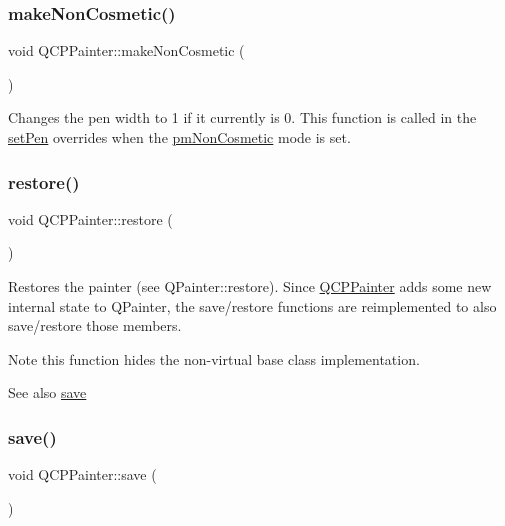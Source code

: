 \subsubsection{\texorpdfstring{make\+Non\+Cosmetic()}{makeNonCosmetic()}}
{\footnotesize\ttfamily void Q\+C\+P\+Painter\+::make\+Non\+Cosmetic (\begin{DoxyParamCaption}{ }\end{DoxyParamCaption})}

Changes the pen width to 1 if it currently is 0. This function is called in the \mbox{\hyperlink{class_q_c_p_painter_af9c7a4cd1791403901f8c5b82a150195}{set\+Pen}} overrides when the \mbox{\hyperlink{class_q_c_p_painter_a156cf16444ff5e0d81a73c615fdb156dac1e481bfaf408f2bd2eaad3ec341f36b}{pm\+Non\+Cosmetic}} mode is set. \mbox{\label{class_q_c_p_painter_a64908e6298d5bbd83457dc987cc3a022}} 
\subsubsection{\texorpdfstring{restore()}{restore()}}
{\footnotesize\ttfamily void Q\+C\+P\+Painter\+::restore (\begin{DoxyParamCaption}{ }\end{DoxyParamCaption})}

Restores the painter (see Q\+Painter\+::restore). Since \mbox{\hyperlink{class_q_c_p_painter}{Q\+C\+P\+Painter}} adds some new internal state to Q\+Painter, the save/restore functions are reimplemented to also save/restore those members.

\begin{DoxyNote}{Note}
this function hides the non-\/virtual base class implementation.
\end{DoxyNote}
\begin{DoxySeeAlso}{See also}
\mbox{\hyperlink{class_q_c_p_painter_a8fd6821ee6fecbfa04444c9062912abd}{save}} 
\end{DoxySeeAlso}
\mbox{\label{class_q_c_p_painter_a8fd6821ee6fecbfa04444c9062912abd}} 
\subsubsection{\texorpdfstring{save()}{save()}}
{\footnotesize\ttfamily void Q\+C\+P\+Painter\+::save (\begin{DoxyParamCaption}{ }\end{DoxyParamCaption})}

